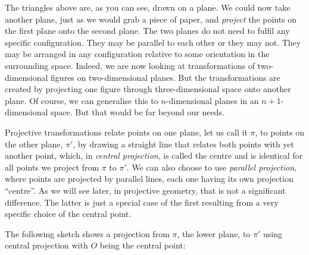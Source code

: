 \documentclass[tikz]{scrreprt}
\begin{document}
The triangles above are, as you can see, drawn on a plane.
We could now take another plane, just as we would grab a
piece of paper, and \emph{project} the points on the first
plane onto the second plane. The two planes do not need
to fulfil any specific configuration. They may be parallel
to each other or they may not. 
They may be arranged in any configuration
relative to some orientation in the surrounding space. 
Indeed, we are now looking at transformations
of two-dimensional figures on two-dimensional planes.
But the transformations are created by projecting one figure
through three-dimensional space onto another plane.
Of course, we can generalise this to $n$-dimensional planes
in an $n+1$-dimensional space.
But that would be far beyond our needs. 

Projective transformations relate points on one plane,
let us call it $\pi$, to points on the other plane, $\pi\prime$,
by drawing a straight line that relates both points with yet
another point, which, in \emph{central projection}, is called
the centre and is identical for all points we project from
$\pi$ to $\pi\prime$. We can also choose to use 
\emph{parallel projection}, where points are projected 
by parallel lines, each one having its own projection ``centre''.
As we will see later, in projective geometry,
that is not a significant difference.
The latter is just a special case of the first resulting
from a very specific choice of the central point.

The following sketch shows a projection from $\pi$,
the lower plane, to $\pi\prime$ using central projection
with $O$ being the central point: 
\end{document}
